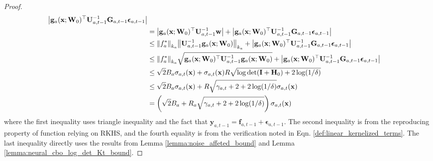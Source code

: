 \begin{proof}
\begin{align*}
        \left \lvert  \mathbf{g}_a(\mathbf{x}; \mathbf{W}_0)^\top \mathbf{U}^{-1}_{a,t-1} \mathbf{G}_{a,t-1} \boldsymbol{\epsilon}_{a, t-1}  \right \rvert 
        \\
        & = \left\lvert  \mathbf{g}_a(\mathbf{x}; \mathbf{W}_0)^\top \mathbf{U}^{-1}_{a,t-1} \mathbf{w}  \right\rvert  + \left\lvert \mathbf{g}_a(\mathbf{x}; \mathbf{W}_0)^\top \mathbf{U}^{-1}_{a,t-1} \mathbf{G}_{a,t-1} \boldsymbol{\epsilon}_{a, t-1}   \right\rvert 
        \\
        & \leq \norm{f_a^*}_{k_a}  \norm{   \mathbf{U}^{-1}_{a,t-1} \mathbf{g}_a(\mathbf{x}; \mathbf{W}_0)}_{k_a} + \left\lvert \mathbf{g}_a(\mathbf{x}; \mathbf{W}_0)^\top \mathbf{U}^{-1}_{a,t-1} \mathbf{G}_{a,t-1} \boldsymbol{\epsilon}_{a, t-1}   \right\rvert \\
        & \leq  \norm{f_a^*}_{k_a}  \sqrt { \mathbf{g}_a(\mathbf{x}; \mathbf{W}_0)^\top \mathbf{U}^{-1}_{a,t-1} \mathbf{g}_a(\mathbf{x}; \mathbf{W}_0)}  + \left\lvert \mathbf{g}_a(\mathbf{x}; \mathbf{W}_0)^\top \mathbf{U}^{-1}_{a,t-1} \mathbf{G}_{a,t-1} \boldsymbol{\epsilon}_{a, t-1}   \right\rvert 
        \\
        & \leq \sqrt{2}B_a \sigma_{a,t}(\mathbf{x}) + \sigma_{a,t}(\mathbf{x}) R \sqrt{\log \det (\mathbf{I} + \mathbf{H}_0) + 2 \log(1/\delta)} 
        \\
        & \le \sqrt{2}B_a \sigma_{a,t}(\mathbf{x}) +  R \sqrt{\gamma_{a,t} + 2 + 2 \log(1/\delta)} \sigma_{a,t}(\mathbf{x}) 
        \\
        & = \left(\sqrt{2}B_a + R_a \sqrt{\gamma_{a,t} + 2 + 2 \log(1/\delta)}\right)\sigma_{a,t}(\mathbf{x})
\end{align*}
where the first inequality uses triangle inequality and the fact that $\mathbf{y}_{a,t-1}= \mathbf{f}_{a, t-1} + \boldsymbol{\epsilon}_{a, t-1}$. The second inequality is from the reproducing property of function relying on RKHS, and the fourth equality is from the verification noted in Eqn.  \ref{def:linear_kernelized_terms}. The last inequality directly uses the results from Lemma \ref{lemma:noise_affeted_bound} and Lemma  \ref{lemma:neural_cbo_log_det_Kt_bound}.


\end{proof}
